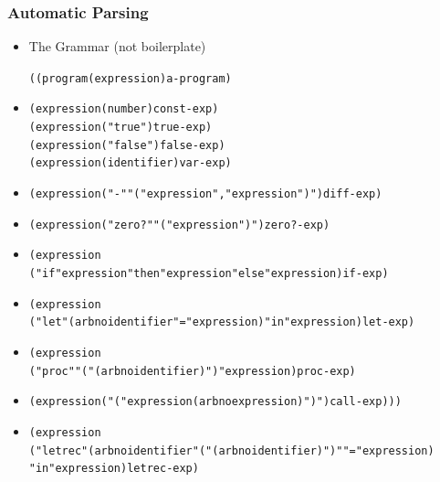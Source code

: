 \documentclass{beamer}
\newcommand{\quot}{\texttt{\textquotesingle{}}}
\begin{document}
\begin{frame}[fragile]
\frametitle{Automatic Parsing}
\begin{scriptsize}
\begin{itemize}
\item<1-> The Grammar (not boilerplate)
\begin{alltt}
\quot{}((program (expression) a-program)
\end{alltt}

\item<2->
\begin{alltt}
  (expression (number) const-exp)
  (expression ("true") true-exp)
  (expression ("false") false-exp)
  (expression (identifier) var-exp)
  \end{alltt}

\item<3->
\begin{alltt}
  (expression("-" "(" expression "," expression ")")diff-exp)
\end{alltt}

\item<4->
\begin{alltt}
  (expression ("zero?" "(" expression ")") zero?-exp)
\end{alltt}

\item<5->
\begin{alltt}
  (expression
    ("if" expression "then" expression "else" expression) if-exp)
\end{alltt}

\item<6->
\begin{alltt}
  (expression
    ("let"(arbno identifier"="expression)"in" expression) let-exp)
\end{alltt}

\item<7->
\begin{alltt}
  (expression
    ("proc" "(" (arbno identifier) ")" expression) proc-exp)
\end{alltt}

\item<8->
\begin{alltt}
  (expression ("(" expression (arbno expression) ")") call-exp)))
\end{alltt}

\item<9->
\begin{alltt}
(expression
  ("letrec"(arbno identifier"("(arbno identifier)")""="expression)
   "in" expression) letrec-exp)
\end{alltt}

\end{itemize}
\end{scriptsize}
\end{frame}
\end{document}
